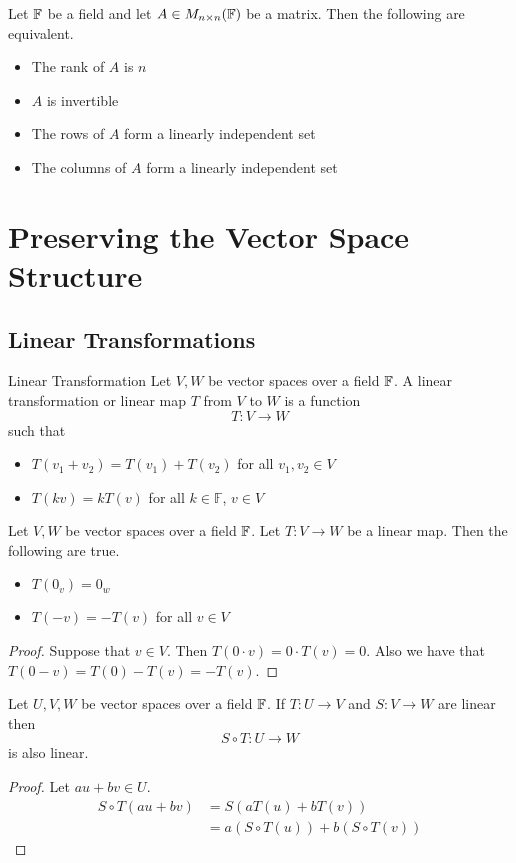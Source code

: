 \documentclass[a4paper]{article}
\begin{document}
\begin{prp}{}{} Let $\mathbb{F}$ be a field and let $A\in M_{n\times n}(\mathbb{F})$ be a matrix. Then the following are equivalent. 
\begin{itemize}
\item The rank of $A$ is $n$
\item $A$ is invertible
\item The rows of $A$ form a linearly independent set
\item The columns of $A$ form a linearly independent set
\end{itemize}
\end{prp}

\pagebreak
\section{Preserving the Vector Space Structure}
\subsection{Linear Transformations}
\begin{defn}{Linear Transformation}{} Let $V,W$ be vector spaces over a field $\mathbb{F}$. A linear transformation or linear map $T$ from $V$ to $W$ is a function $$T:V\to W$$ such that 
\begin{itemize}
\item $T(v_1+v_2)=T(v_1)+T(v_2)$ for all $v_1,v_2\in V$
\item $T(kv)=kT(v)$ for all $k\in\mathbb{F}$, $v\in V$
\end{itemize}
\end{defn}

\begin{lmm}{}{} Let $V,W$ be vector spaces over a field $\mathbb{F}$. Let $T:V\to W$ be a linear map. Then the following are true. 
\begin{itemize}
\item $T(0_v)=0_w$
\item $T(-v)=-T(v)$ for all $v\in V$
\end{itemize}\tcbline
\begin{proof} Suppose that $v\in V$. Then $T(0\cdot v)=0\cdot T(v)=0$. Also we have that $T(0-v)=T(0)-T(v)=-T(v)$. 
\end{proof}
\end{lmm}

\begin{prp}{}{} Let $U,V,W$ be vector spaces over a field $\mathbb{F}$. If $T:U\to V$ and $S:V\to W$ are linear then $$S\circ T:U\to W$$ is also linear. \tcbline
\begin{proof} Let $au+bv\in U$. 
\begin{align*}
S\circ T(au+bv)&=S(aT(u)+bT(v))\\
&=a(S\circ T(u))+b(S\circ T(v))
\end{align*}
\end{proof}
\end{prp}
\end{document}
